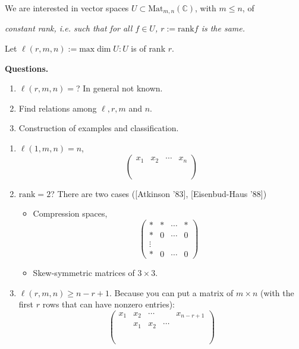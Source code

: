 \medskip\noindent

We are interested in vector spaces $U \subset \text{Mat}_{m,n}(\mathbb{C})$,
with $m \leq n$, of {\it constant rank, i.e. such that for all $f \in U$,
$r:=\text{rank}f$ is the same.

Let $\ell(r,m,n):=\text{max}\dim U:U$ is of rank $r$.

\medskip\noindent
{\bf Questions.}
\begin{enumerate}
\item $\ell(r,m,n)=$? In general not known.
\item Find relations among $\ell, r,m$ and $n$.
\item Construction of examples and classification.
\end{enumerate}

\begin{example}
\label{example-what-we-know}
\begin{enumerate}
\item $\ell(1,m,n)=n$,
$$
\begin{pmatrix}
x_1&x_2&\cdots &x_n\\
\\
\\
\\
\end{pmatrix}
$$
\item $\text{rank}=2$? There are two cases ([Atkinson '83], [Eisenbud-Haus '88])
\begin{itemize}
\item Compression spaces,
$$
\begin{pmatrix}
*&*&\cdots &*\\
*&0&\cdots & 0\\
\vdots &\\
*&0&\cdots&0
\end{pmatrix}
$$
\item Skew-symmetric matrices of $3 \times 3$.
\end{itemize}
\item $\ell(r,m,n) \geq n-r+1$. Because you can put a matrix of
$m\times n$ (with the first $r$ rows that can have nonzero entries):
$$
\begin{pmatrix}
x_1 &  x_2 &  \cdots & & x_{n-r+1}\\
& x_1 & x_2 & \cdots &\\
\\
\\
\\
\end{pmatrix}
$$
\end{enumerate}
\end{example}

}
